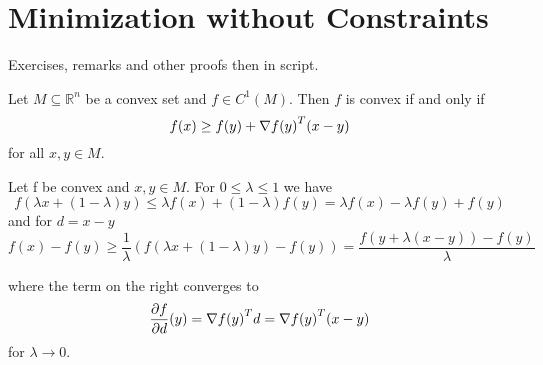 
\newpage
\section{Minimization without Constraints}

Exercises, remarks and other proofs then in script.


\lemma{}
Let \(M \subseteq \mathbb{R}^n\) be a convex set and \(f \in C^1(M)\). Then \(f\) is convex if and only if
\begin{equation}
    f(x) \ge f(y) + \nabla {f(y)}^T (x - y)
\end{equation}
for all \(x, y \in M \). 

\proof{}
Let f be convex and \(x, y \in M\). For \(0 \le \lambda \le 1\) we have
\[ 
    f(\lambda x + (1 - \lambda) y) \le \lambda f(x) + (1 - \lambda)f(y) =  \lambda f(x) - \lambda f(y) + f(y) 
\]
and for \( d = x - y \)\
\[ 
    f(x) - f(y) \ge \frac{1}{\lambda} (f(\lambda x + (1 - \lambda) y) - f(y)) 
        = \frac{f(y + \lambda (x - y)) - f(y)}{\lambda}
\]

where the term on the right converges to 
\[
    \frac{\partial f}{\partial d}(y) = \nabla{f(y)}^T d = \nabla{f(y)}^T (x - y) 
\]
for \( \lambda \to 0 \).